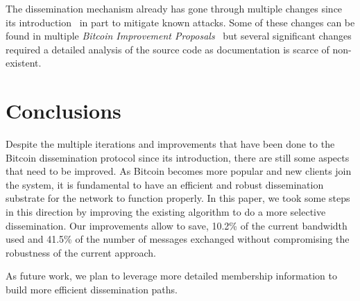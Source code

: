 \documentclass{dads}   %
\begin{document}
The dissemination mechanism already has gone through multiple changes since its introduction~\cite{nakamoto2008bitcoin} in part to mitigate known attacks. Some of these changes can be found in multiple \textsl{Bitcoin Improvement Proposals}~\cite{bip152, bip130, bips} but several significant changes required a detailed analysis of the source code as documentation is scarce of non-existent.

\section{Conclusions}
Despite the multiple iterations and improvements  that have been done to the Bitcoin dissemination protocol since its introduction, there are still  some aspects that need to be improved. 
As Bitcoin becomes more popular and new clients join the system, it is fundamental to have an efficient and robust dissemination substrate for the network to function properly.
In this paper, we took some steps in this direction by improving the existing algorithm to do a more selective dissemination.
Our improvements allow to save, 10.2\% of the current bandwidth used and 41.5\% of the number of messages exchanged without compromising the robustness of the current approach.

As future work, we plan to leverage more detailed membership information to build more efficient dissemination paths.


%

%
%
\end{document}
